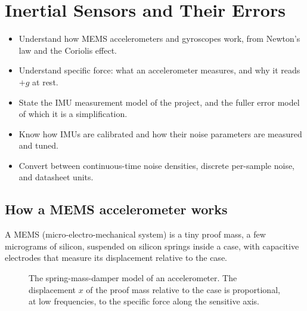 \chapter{Inertial Sensors and Their Errors}
\label{ch:imu}

\begin{objectives}
\begin{itemize}
  \item Understand how MEMS accelerometers and gyroscopes work, from Newton's law and the Coriolis effect.
  \item Understand specific force: what an accelerometer measures, and why it reads $+g$ at rest.
  \item State the IMU measurement model of the project, and the fuller error model of which it is a simplification.
  \item Know how IMUs are calibrated and how their noise parameters are measured and tuned.
  \item Convert between continuous-time noise densities, discrete per-sample noise, and datasheet units.
\end{itemize}
\end{objectives}

\section{How a MEMS accelerometer works}

A MEMS (micro-electro-mechanical system)  is a tiny proof mass, a few micrograms of silicon, suspended on silicon springs inside a
case, with capacitive electrodes that measure its displacement relative to the case.

\begin{figure}[t]
\centering
{}
\caption{The spring-mass-damper model of an accelerometer. The displacement $x$ of the proof mass relative to the case is proportional, at low frequencies,
to the specific force along the sensitive axis.}
\label{fig:accel-model}
\end{figure}

